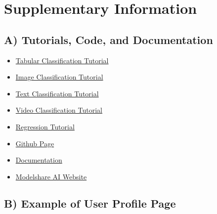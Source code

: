 \section{Supplementary Information}
\appendix

\subsection{A) Tutorials, Code, and Documentation}
\label{app:tutorials}

\begin{itemize}


\item 
\href{https://colab.research.google.com/github/AIModelShare/aimodelshare_tutorials/blob/main/modelshareai/QST_Tabular_Classification.ipynb}{Tabular Classification Tutorial}

\item 
\href{https://colab.research.google.com/github/AIModelShare/aimodelshare_tutorials/blob/main/modelshareai/Keras_Image_Classification_Quick_Start_Tutorial.ipynb}{Image Classification Tutorial}

\item 
\href{https://colab.research.google.com/github/AIModelShare/aimodelshare_tutorials/blob/main/modelshareai/Text_Classification_QuickStart_IMDB.ipynb}{Text Classification Tutorial}

\item 
\href{https://colab.research.google.com/github/AIModelShare/aimodelshare_tutorials/blob/main/modelshareai/Keras_Video_Classification_Quick_Start_Tutorial(1).ipynb}{Video Classification Tutorial}

\item 
\href{https://www.modelshare.ai/notebooks/notebook:229}{Regression Tutorial}

\item 
\href{https://github.com/AIModelShare/aimodelshare}{Github Page}

\item 
\href{https://aimodelshare.readthedocs.io/en/latest/index.html}{Documentation}

\item 
\href{https://www.modelshare.ai/}{Modelshare AI Website}


\end{itemize}

\newpage
\subsection{B) Example of User Profile Page}
\label{app:profile_page}

